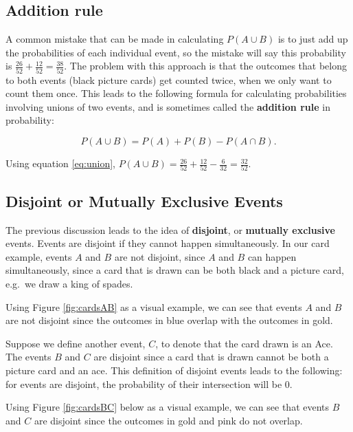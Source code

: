 \documentclass[
]{book}
\begin{document}
\subsection{Addition rule}\label{addition-rule}

A common mistake that can be made in calculating \(P(A \cup B)\) is to just add up the probabilities of each individual event, so the mistake will say this probability is \(\frac{26}{52} + \frac{12}{52} = \frac{38}{52}\). The problem with this approach is that the outcomes that belong to both events (black picture cards) get counted twice, when we only want to count them once. This leads to the following formula for calculating probabilities involving unions of two events, and is sometimes called the \textbf{addition rule} in probability:

\begin{equation} 
P(A \cup B) = P(A) + P(B) - P(A \cap B).
\label{eq:union}
\end{equation}

Using equation \eqref{eq:union}, \(P(A \cup B) = \frac{26}{52} + \frac{12}{52} - \frac{6}{32} = \frac{32}{52}\).

\subsection{Disjoint or Mutually Exclusive Events}\label{disjoint-or-mutually-exclusive-events}

The previous discussion leads to the idea of \textbf{disjoint}, or \textbf{mutually exclusive} events. Events are disjoint if they cannot happen simultaneously. In our card example, events \(A\) and \(B\) are not disjoint, since \(A\) and \(B\) can happen simultaneously, since a card that is drawn can be both black and a picture card, e.g.~we draw a king of spades.

Using Figure \ref{fig:cardsAB} as a visual example, we can see that events \(A\) and \(B\) are not disjoint since the outcomes in blue overlap with the outcomes in gold.

Suppose we define another event, \(C\), to denote that the card drawn is an Ace. The events \(B\) and \(C\) are disjoint since a card that is drawn cannot be both a picture card and an ace. This definition of disjoint events leads to the following: for events are disjoint, the probability of their intersection will be 0.

Using Figure \ref{fig:cardsBC} below as a visual example, we can see that events \(B\) and \(C\) are disjoint since the outcomes in gold and pink do not overlap.
\end{document}
